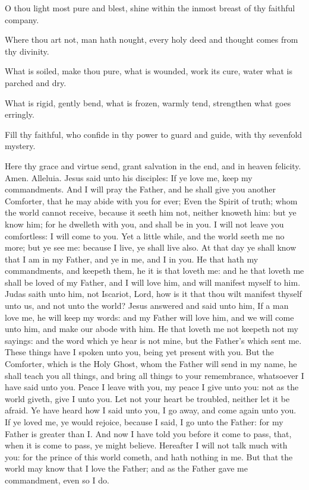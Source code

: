 O thou light most pure and blest, shine within the inmost breast of thy faithful company.

Where thou art not, man hath nought, every holy deed and thought comes from thy divinity.

What is soiled, make thou pure, what is wounded, work its cure, water what is parched and dry.

What is rigid, gently bend, what is frozen, warmly tend, strengthen what goes erringly.

Fill thy faithful, who confide in thy power to guard and guide, with thy sevenfold mystery.

Here thy grace and virtue send, grant salvation in the end, and in heaven felicity. Amen. Alleluia.
 Jesus said unto his disciples: If ye love me, keep my commandments. And I will pray the Father, and he shall give you another Comforter, that he may abide with you for ever; Even the Spirit of truth; whom the world cannot receive, because it seeth him not, neither knoweth him: but ye know him; for he dwelleth with you, and shall be in you. I will not leave you comfortless: I will come to you. Yet a little while, and the world seeth me no more; but ye see me: because I live, ye shall live also. At that day ye shall know that I am in my Father, and ye in me, and I in you. He that hath my commandments, and keepeth them, he it is that loveth me: and he that loveth me shall be loved of my Father, and I will love him, and will manifest myself to him. Judas saith unto him, not Iscariot, Lord, how is it that thou wilt manifest thyself unto us, and not unto the world? Jesus answered and said unto him, If a man love me, he will keep my words: and my Father will love him, and we will come unto him, and make our abode with him. He that loveth me not keepeth not my sayings: and the word which ye hear is not mine, but the Father's which sent me. These things have I spoken unto you, being yet present with you. But the Comforter, which is the Holy Ghost, whom the Father will send in my name, he shall teach you all things, and bring all things to your remembrance, whatsoever I have said unto you. Peace I leave with you, my peace I give unto you: not as the world giveth, give I unto you. Let not your heart be troubled, neither let it be afraid. Ye have heard how I said unto you, I go away, and come again unto you. If ye loved me, ye would rejoice, because I said, I go unto the Father: for my Father is greater than I. And now I have told you before it come to pass, that, when it is come to pass, ye might believe. Hereafter I will not talk much with you: for the prince of this world cometh, and hath nothing in me. But that the world may know that I love the Father; and as the Father gave me commandment, even so I do.

